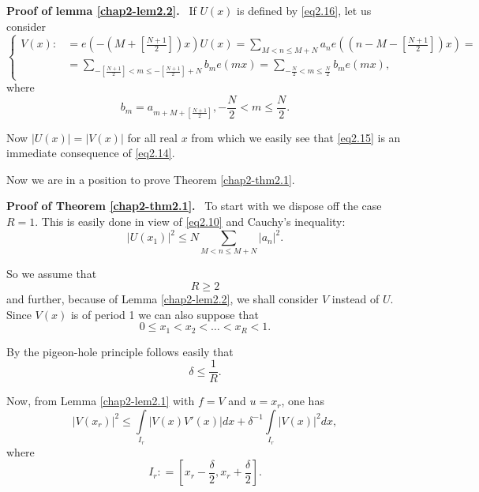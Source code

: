 \noindent
{\bf Proof of lemma \ref{chap2-lem2.2}.}~
If $U(x)$ is defined by \eqref{eq2.16}, let us consider
{\fontsize{10pt}{12pt}\selectfont
\begin{equation*}
\begin{cases}
V(x):&= e(- (M+\left[ \frac{N+1}{2} \right] )x)U(x) = \sum\limits_{M< n \leq
  M+N} a_ne((n-M- \left[ \frac{N+1}{2} \right] )x) =\\ 
&= \sum\limits_{ -\left[ \frac{N+1}{2} \right] < m \leq - \left[
  \frac{N+1}{2} \right] +N} b_m e(mx)= \sum\limits_{- \frac{N}{2} < m \leq
  \frac{N}{2}} b_m e(mx), 
\end{cases}\tag{2.17} \label{eq2.17}
\end{equation*}}\relax
where\pageoriginale
\begin{equation*}
b_m =a_{m+M+ \left[ \frac{N+1}{2} \right]}, -\frac{N}{2} < m \leq
\frac{N}{2}. \tag{2.18}\label{eq2.18} 
\end{equation*}

Now $| U(x)| = |V(x)|$ for all real $x$ from which we easily see that
\eqref{eq2.15} is an immediate consequence of \eqref{eq2.14}. 

Now we are in a position to prove Theorem \ref{chap2-thm2.1}.

\medskip
\noindent
{\bf Proof of Theorem \ref{chap2-thm2.1}.}~
To start with we dispose off the case $R=1$. This is easily done
in view of \eqref{eq2.10} and Cauchy's inequality: 
\begin{equation*}
|U(x_1)|^2 \leq N \sum_{M <n \leq M+N} |a_n|^2. \tag{2.19}\label{eq2.19}
\end{equation*}

So we assume that 
\begin{equation*}
R \geq 2 \tag{2.20}\label{eq2.20}
\end{equation*}
and further, because of Lemma \ref{chap2-lem2.2}, we shall consider
$V$ instead of $U$. Since $V(x)$ is of period 1 we can also suppose
that  
\begin{equation*}
0 \leq x_1 < x_2 < \ldots < x_R < 1. \tag{2.21}\label{eq2.21}
\end{equation*}

By the pigeon-hole principle follows easily that 
\begin{equation*}
\delta \leq \frac{1}{R}. \tag{2.22}\label{eq2.22}
\end{equation*}

Now, from Lemma \ref{chap2-lem2.1} with $f = V$ and $u = x_r$, one has 
\begin{equation*}
|V(x_r)|^2 \leq \int\limits_{I_r}|V(x)V'(x)|dx + \delta^{-1}
\int\limits_{I_r}|V(x)|^2 dx, \tag{2.23}\label{eq2.23} 
\end{equation*}
where
\begin{equation*}
I_r : =[x_r -\frac{\delta}{2}, x_r +
  \frac{\delta}{2}]. \tag{2.24}\label{eq2.24}  
\end{equation*}

